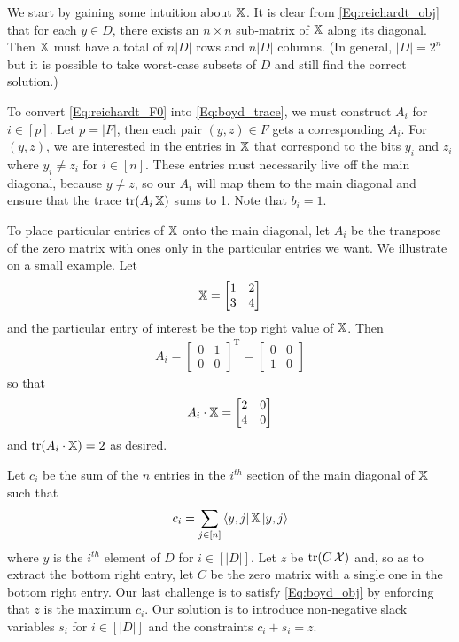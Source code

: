 We start by gaining some intuition about $\operatorname{\mathbb{X}}$.
It is clear from \cref{Eq:reichardt_obj} that for 
each $y \in D$, there exists an $n \times n$ sub-matrix of $\operatorname{\mathbb{X}}$ along its diagonal.
Then $\operatorname{\mathbb{X}}$ must have a total of $n|D|$ rows and $n|D|$ columns.
(In general, $|D| = 2^n$ but it is possible to take 
worst-case subsets of $D$ and still find the correct solution.)

To convert \cref{Eq:reichardt_F0} into \cref{Eq:boyd_trace},
we must construct $A_i$ for $i \in [p]$.
Let $p = |F|$, then each pair $(y,z) \in F$
gets a corresponding $A_i$.
For $(y,z)$, we are interested in the entries
in $\operatorname{\mathbb{X}}$ that correspond to the bits $y_i$ and $z_i$
where $y_i \neq z_i$ for $i \in [n]$.
These entries must necessarily live off the main diagonal,
because $y\neq z$,
so our $A_i$ will map them to the main diagonal 
and ensure that the trace $\operatorname{\text{tr}}(A_i \operatorname{\mathbb{X}})$ sums to 1.
Note that $b_i = 1$.

To place particular entries of $\operatorname{\mathbb{X}}$ onto the main diagonal,
let $A_i$ be the transpose of the zero matrix with
ones only in the particular entries we want.
We illustrate on a small example.
Let
\begin{align}
    \operatorname{\mathbb{X}} = \left[ \begin{matrix} 1 & 2 \\ 3 & 4 \end{matrix} \right] \nonumber
\end{align}
and the particular entry of interest be the top right value of $\operatorname{\mathbb{X}}$.
Then
\begin{align}
    A_i = \left[ \begin{matrix} 0 & 1 \\ 0 & 0 \end{matrix} \right]^\textrm{T} \nonumber
    = \left[ \begin{matrix} 0 & 0 \\ 1 & 0 \end{matrix} \right] \nonumber
\end{align}
so that
\begin{align}
    A_i \cdot \operatorname{\mathbb{X}} = \left[ \begin{matrix} 2 & 0 \\ 4 & 0 \end{matrix} \right] \nonumber
\end{align}
and $\operatorname{\text{tr}}(A_i \cdot \operatorname{\mathbb{X}}) = 2$ as desired.

Let $c_i$ be the sum of the $n$ entries
in the $i^{th}$ section of the main diagonal of $\operatorname{\mathbb{X}}$
such that
\begin{align}
    c_i = \sum_{j \in [n]} \bra{y,j}\operatorname{\mathbb{X}}\ket{y,j}
    \nonumber
\end{align} 
where $y$ is the $i^{th}$ element of $D$ for
$i \in [|D|]$.
Let $z$ be $\operatorname{\text{tr}}(C\operatorname{\mathcal{X}})$ and, so as to extract the bottom right entry,
let $C$ be the zero matrix with a single one in the bottom right entry.
Our last challenge is to satisfy \cref{Eq:boyd_obj}
by enforcing that $z$ is the maximum $c_i$.
Our solution is to introduce non-negative slack variables
$s_i$ for $i \in [|D|]$ and the constraints
$c_i + s_i = z$.

